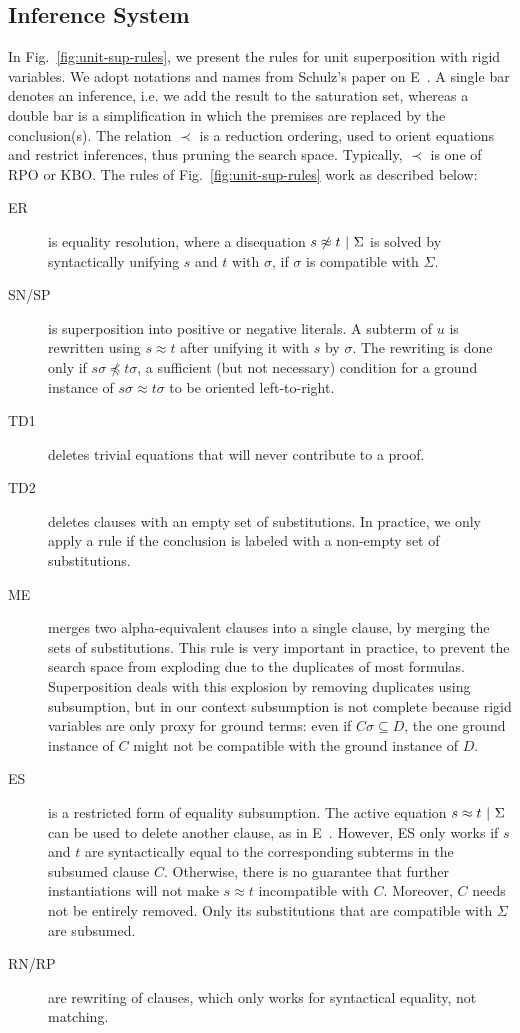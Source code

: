 \subsection{Inference System}

In Fig.~\ref{fig:unit-sup-rules}, we present the rules for unit superposition
with rigid variables. We adopt notations and names from Schulz's paper on
E~\cite{SS02}. A single bar denotes an inference, i.e. we add the result to the
saturation set, whereas a double bar is a simplification in which the premises
are replaced by the conclusion(s). The relation $\prec$ is a reduction ordering,
used to orient equations and restrict inferences, thus pruning the search space.
Typically, $\prec$ is one of RPO or KBO. The rules of
Fig.~\ref{fig:unit-sup-rules} work as described below:

\begin{description}
\item[ER] is equality resolution, where a disequation
$s \not\approx t ~|~ \Sigma$ is solved by syntactically unifying
$s$ and $t$ with $\sigma$, if $\sigma$ is compatible with $\Sigma$.
\item[SN/SP] is superposition into positive or negative literals. A subterm of
$u$ is rewritten using $s \approx t$ after unifying it with $s$ by $\sigma$. The
rewriting is done only if $s\sigma \not\preceq t\sigma$, a sufficient (but not
necessary) condition for a ground instance of $s\sigma \approx t\sigma$ to be
oriented left-to-right.
\item[TD1] deletes trivial equations that will never contribute to a proof.
\item[TD2] deletes clauses with an empty set of substitutions. In practice, we
only apply a rule if the conclusion is labeled with a non-empty set of
substitutions.
\item[ME] merges two alpha-equivalent clauses into a single clause, by merging
the sets of substitutions. This rule is very important in practice, to prevent
the search space from exploding due to the duplicates of most formulas.
Superposition deals with this explosion by removing duplicates using
subsumption, but in our context subsumption is not complete because rigid
variables are only proxy for ground terms: even if $C\sigma \subseteq D$, the
one ground instance of $C$ might not be compatible with the ground instance of
$D$.
\item[ES] is a restricted form of equality subsumption. The active equation
$ s\approx t ~|~ \Sigma $ can be used to delete another clause, as
in E~\cite{SS02}. However, ES only works if $s$ and $t$ are syntactically equal
to the corresponding subterms in the subsumed clause $C$. Otherwise, there is no
guarantee that further instantiations will not make $s\approx t$ incompatible
with $C$. Moreover, $C$ needs not be entirely removed. Only its substitutions
that are compatible with $\Sigma$ are subsumed.
\item[RN/RP] are rewriting of clauses, which only works for syntactical
equality, not matching.
\end{description}

